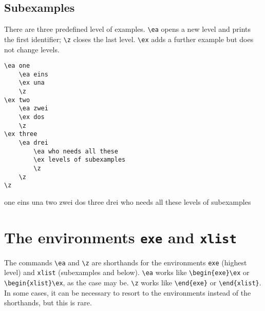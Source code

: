 \documentclass[output=guidelines]{langscibook}
\newcommand{\cmd}[1]{\texttt{\textbackslash#1}}
\newcommand{\env}[1]{\texttt{#1}}
\begin{document}
\subsection{Subexamples}
There are three predefined level of examples. \cmd{ea} opens a new level and prints the first identifier; \cmd{z} closes the last level. \cmd{ex} adds a further example but does not change levels. 

\begin{minipage}{.55\textwidth}
\begin{lstlisting}
\ea one
    \ea eins
    \ex una
    \z
\ex two
    \ea zwei
    \ex dos
    \z
\ex three
    \ea drei
        \ea who needs all these
        \ex levels of subexamples
        \z
    \z
\z
 \end{lstlisting}
\end{minipage}
\parbox{.45\textwidth}{
\ea one
    \ea eins
    \ex una
    \z
\ex two
    \ea zwei
    \ex dos
    \z
\ex three
    \ea drei
        \ea who needs all these
        \ex levels of subexamples
        \z
    \z
\z
}

\section{The environments \texttt{exe} and \texttt{xlist}}
The commands \cmd{ea} and \cmd{z} are shorthands for the environments \env{exe} (highest level) and \env{xlist} (subexamples and below). \cmd{ea} works like \verb+\begin{exe}\ex+ or \verb+\begin{xlist}\ex+, as the case may be. \cmd{z} works like \verb+\end{exe}+ or \verb+\end{xlist}+. In some cases, it can be necessary to resort to the environments instead of the shorthands, but this is rare. 
\end{document}
